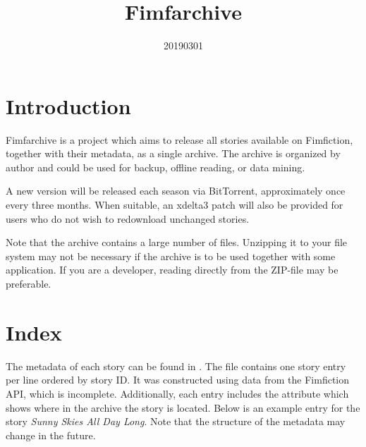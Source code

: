 \documentclass[hidelinks,a4paper,12pt]{article}
\begin{document}
\title{Fimfarchive}
\date{20190301}

\maketitle
\newpage
\tableofcontents
\newpage

\section{Introduction} \label{sec:introduction}

Fimfarchive is a project which aims to release all stories available on Fimfiction, together with their metadata, as a single archive. The archive is organized by author and could be used for backup, offline reading, or data mining.

A new version will be released each season via BitTorrent, approximately once every three months. When suitable, an xdelta3 patch will also be provided for users who do not wish to redownload unchanged stories.

Note that the archive contains a large number of files. Unzipping it to your file system may not be necessary if the archive is to be used together with some application. If you are a developer, reading directly from the ZIP-file may be preferable.


\section{Index} \label{sec:index}

The metadata of each story can be found in . The file contains one story entry per line ordered by story ID. It was constructed using data from the Fimfiction API, which is incomplete. Additionally, each entry includes the attribute  which shows where in the archive the story is located. Below is an example entry for the story \emph{Sunny Skies All Day Long}. Note that the structure of the metadata may change in the future.
\end{document}
